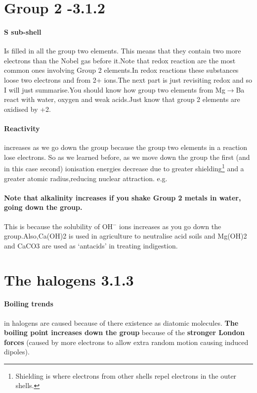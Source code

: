 \section{Group 2 -3.1.2}

	\paragraph{S sub-shell} Is filled in all the group two elements.
	This means that they contain two more electrons than the Nobel gas before it.Note that redox reaction are the most common ones involving Group 2 elements.In redox reactions these substances loose two electrons and from 2+ ions.The next part is just revisiting redox and so I will just summarise.You should know how group two elements from Mg$\rightarrow$Ba react with water, oxygen and weak acids.Just know that group 2 elements are oxidised by +2.
	
	\paragraph{Reactivity} increases as we go down the group because the group two elements in a reaction lose electrons.
	So as we learned before, as we move down the group the first (and in this case second) ionisation energies decrease due to greater shielding\footnote{Shielding is where electrons from other shells repel electrons in the outer shells.} and a greater atomic radius,reducing nuclear attraction.
e.g. 
\paragraph{Note that alkalinity increases if you shake Group 2 metals in water, going down the group.}This is because the solubility of OH$^-$ ions increases as you go down the group.Also,Ca(OH)2 is used in agriculture to neutralise acid soils and Mg(OH)2 and CaCO3 are used as ‘antacids’ in treating indigestion.
\section{The halogens 3.1.3}
	\paragraph{Boiling trends} in halogens are caused because of there existence as diatomic molecules.
	\textbf{The boiling point increases down the group} because of the \textbf{stronger London forces} (caused by more electrons to allow extra random motion causing induced dipoles).
